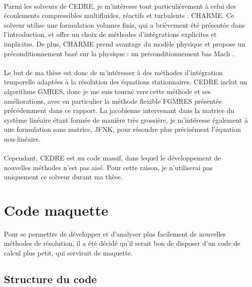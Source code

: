   \paragraph{}
  Parmi les solveurs de CEDRE, je m'intéresse tout particulièrement à celui des écoulements compressibles multifluides, réactifs et turbulents : CHARME.
  Ce solveur utilise une formulation volumes finis, qui a brièvement été présentée dans l'introduction, et offre un choix de méthodes d'intégrations explicites et implicites.
  De plus, CHARME prend avantage du modèle physique et propose un préconditionnement basé sur la physique : un préconditionnement bas Mach \cite{Turkel1987}.

  \paragraph{}
  Le but de ma thèse est donc de m'intéresser à des méthodes d'intégration temporelle adaptées à la résolution des équations stationnaires.
  CEDRE inclut un algorithme GMRES, donc je me suis tourné vers cette méthode et ses améliorations, avec en particulier la méthode flexible FGMRES présentée précédemment dans ce rapport.
  La jacobienne intervenant dans la matrice du système linéaire étant formée de manière très grossière, je m'intéresse également à une formulation sans matrice, JFNK, pour résoudre plus précisément l'équation non-linéaire.

  \paragraph{}
  Cependant, CEDRE est un code massif, dans lequel le développement de nouvelles méthodes n'est pas aisé.
  Pour cette raison, je n'utiliserai pas uniquement ce solveur durant ma thèse.


\section{Code maquette}

  \paragraph{}
  Pour se permettre de développer et d'analyser plus facilement de nouvelles méthodes de résolution, il a été décidé qu'il serait bon de disposer d'un code de calcul plus petit, qui servirait de maquette.

  \subsection{Structure du code}

